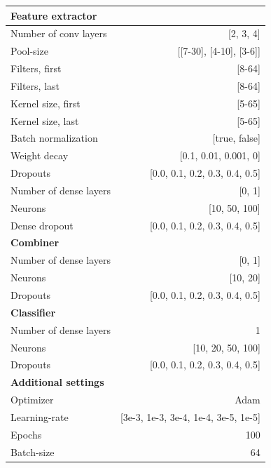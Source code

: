 \documentclass[preprint]{elsarticle}
\begin{document}
\renewcommand{\arraystretch}{1}


\renewcommand{\arraystretch}{1.2}
\begin{table}[H]
  \centering
  \scriptsize
\begin{adjustbox}{center}
\begin{tabular}{@{}lr@{}}
\textbf{Feature extractor}  & \\
\midrule
{Number of conv layers}     & [2, 3, 4] \\
{Pool-size}                 & [[7-30], [4-10], [3-6]] \\
{Filters, first}            & [8-64] \\
{Filters, last}             & [8-64] \\
{Kernel size, first}        & [5-65] \\
{Kernel size, last}         & [5-65] \\
{Batch normalization}       & [true, false] \\
{Weight decay}              & [0.1, 0.01, 0.001, 0] \\
{Dropouts}                  & [0.0, 0.1, 0.2, 0.3, 0.4, 0.5] \\
{Number of dense layers}    & [0, 1] \\
{Neurons}                   & [10, 50, 100] \\
{Dense dropout}             & [0.0, 0.1, 0.2, 0.3, 0.4, 0.5] \\
\midrule
\textbf{Combiner}           & \\
\midrule
{Number of dense layers}    & [0, 1] \\
{Neurons}                   & [10, 20] \\
{Dropouts}                  & [0.0, 0.1, 0.2, 0.3, 0.4, 0.5] \\
\midrule
\textbf{Classifier}         & \\
\midrule
{Number of dense layers}    & 1 \\
{Neurons}                   & [10, 20, 50, 100] \\
{Dropouts}                  & [0.0, 0.1, 0.2, 0.3, 0.4, 0.5] \\
\midrule
\textbf{Additional settings} & \\
\midrule
Optimizer                   & Adam \\
Learning-rate               & [3e-3, 1e-3, 3e-4, 1e-4, 3e-5, 1e-5] \\
Epochs                      & 100 \\
Batch-size                  & 64 \\


\end{tabular}
\end{adjustbox}
\end{table}
\end{document}
